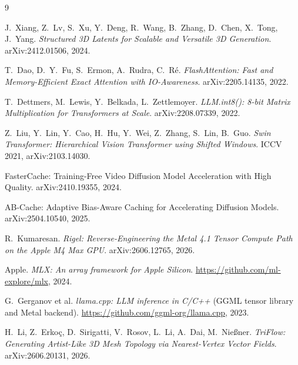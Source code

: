 \documentclass[11pt]{article}
\begin{document}
\begin{thebibliography}{9}

J.\ Xiang, Z.\ Lv, S.\ Xu, Y.\ Deng, R.\ Wang, B.\ Zhang, D.\ Chen, X.\ Tong, J.\ Yang.
\emph{Structured 3D Latents for Scalable and Versatile 3D Generation}.
arXiv:2412.01506, 2024.

T.\ Dao, D.\ Y.\ Fu, S.\ Ermon, A.\ Rudra, C.\ R\'{e}.
\emph{FlashAttention: Fast and Memory-Efficient Exact Attention with IO-Awareness}.
arXiv:2205.14135, 2022.

T.\ Dettmers, M.\ Lewis, Y.\ Belkada, L.\ Zettlemoyer.
\emph{LLM.int8(): 8-bit Matrix Multiplication for Transformers at Scale}.
arXiv:2208.07339, 2022.

Z.\ Liu, Y.\ Lin, Y.\ Cao, H.\ Hu, Y.\ Wei, Z.\ Zhang, S.\ Lin, B.\ Guo.
\emph{Swin Transformer: Hierarchical Vision Transformer using Shifted Windows}.
ICCV 2021, arXiv:2103.14030.

FasterCache: Training-Free Video Diffusion Model Acceleration with High Quality.
arXiv:2410.19355, 2024.

AB-Cache: Adaptive Bias-Aware Caching for Accelerating Diffusion Models.
arXiv:2504.10540, 2025.

R.\ Kumaresan.
\emph{Rigel: Reverse-Engineering the Metal 4.1 Tensor Compute Path on the Apple M4 Max GPU}.
arXiv:2606.12765, 2026.

Apple.
\emph{MLX: An array framework for Apple Silicon}.
\url{https://github.com/ml-explore/mlx}, 2024.

G.\ Gerganov et al.
\emph{llama.cpp: LLM inference in C/C++} (GGML tensor library and Metal backend).
\url{https://github.com/ggml-org/llama.cpp}, 2023.

H.\ Li, Z.\ Erko\c{c}, D.\ Sirigatti, V.\ Rosov, L.\ Li, A.\ Dai, M.\ Nie\ss{}ner.
\emph{TriFlow: Generating Artist-Like 3D Mesh Topology via Nearest-Vertex Vector Fields}.
arXiv:2606.20131, 2026.

\end{thebibliography}
\end{document}
